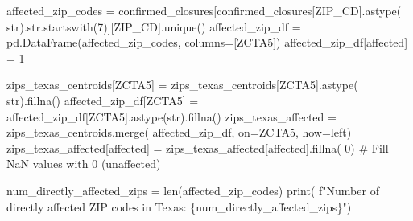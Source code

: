 \documentclass[
  letterpaper,
  DIV=11,
  numbers=noendperiod]{scrartcl}
\newenvironment{Shaded}{\begin{snugshade}}{\end{snugshade}}
\newcommand{\BuiltInTok}[1]{\textcolor[rgb]{0.00,0.23,0.31}{#1}}
\newcommand{\CommentTok}[1]{\textcolor[rgb]{0.37,0.37,0.37}{#1}}
\newcommand{\DecValTok}[1]{\textcolor[rgb]{0.68,0.00,0.00}{#1}}
\newcommand{\NormalTok}[1]{\textcolor[rgb]{0.00,0.23,0.31}{#1}}
\newcommand{\OperatorTok}[1]{\textcolor[rgb]{0.37,0.37,0.37}{#1}}
\newcommand{\SpecialCharTok}[1]{\textcolor[rgb]{0.37,0.37,0.37}{#1}}
\newcommand{\SpecialStringTok}[1]{\textcolor[rgb]{0.13,0.47,0.30}{#1}}
\newcommand{\StringTok}[1]{\textcolor[rgb]{0.13,0.47,0.30}{#1}}
\begin{document}
\begin{Shaded}
\begin{Highlighting}[]
\NormalTok{affected\_zip\_codes }\OperatorTok{=}\NormalTok{ confirmed\_closures[confirmed\_closures[}\StringTok{\textquotesingle{}ZIP\_CD\textquotesingle{}}\NormalTok{].astype(}
    \BuiltInTok{str}\NormalTok{).}\BuiltInTok{str}\NormalTok{.startswith(}\StringTok{\textquotesingle{}7\textquotesingle{}}\NormalTok{)][}\StringTok{\textquotesingle{}ZIP\_CD\textquotesingle{}}\NormalTok{].unique()}
\NormalTok{affected\_zip\_df }\OperatorTok{=}\NormalTok{ pd.DataFrame(affected\_zip\_codes, columns}\OperatorTok{=}\NormalTok{[}\StringTok{\textquotesingle{}ZCTA5\textquotesingle{}}\NormalTok{])}
\NormalTok{affected\_zip\_df[}\StringTok{\textquotesingle{}affected\textquotesingle{}}\NormalTok{] }\OperatorTok{=} \DecValTok{1}

\NormalTok{zips\_texas\_centroids[}\StringTok{\textquotesingle{}ZCTA5\textquotesingle{}}\NormalTok{] }\OperatorTok{=}\NormalTok{ zips\_texas\_centroids[}\StringTok{\textquotesingle{}ZCTA5\textquotesingle{}}\NormalTok{].astype(}
    \BuiltInTok{str}\NormalTok{).fillna(}\StringTok{\textquotesingle{}\textquotesingle{}}\NormalTok{)}
\NormalTok{affected\_zip\_df[}\StringTok{\textquotesingle{}ZCTA5\textquotesingle{}}\NormalTok{] }\OperatorTok{=}\NormalTok{ affected\_zip\_df[}\StringTok{\textquotesingle{}ZCTA5\textquotesingle{}}\NormalTok{].astype(}\BuiltInTok{str}\NormalTok{).fillna(}\StringTok{\textquotesingle{}\textquotesingle{}}\NormalTok{)}
\NormalTok{zips\_texas\_affected }\OperatorTok{=}\NormalTok{ zips\_texas\_centroids.merge(}
\NormalTok{    affected\_zip\_df, on}\OperatorTok{=}\StringTok{\textquotesingle{}ZCTA5\textquotesingle{}}\NormalTok{, how}\OperatorTok{=}\StringTok{\textquotesingle{}left\textquotesingle{}}\NormalTok{)}
\NormalTok{zips\_texas\_affected[}\StringTok{\textquotesingle{}affected\textquotesingle{}}\NormalTok{] }\OperatorTok{=}\NormalTok{ zips\_texas\_affected[}\StringTok{\textquotesingle{}affected\textquotesingle{}}\NormalTok{].fillna(}
    \DecValTok{0}\NormalTok{)  }\CommentTok{\# Fill NaN values with 0 (unaffected)}

\NormalTok{num\_directly\_affected\_zips }\OperatorTok{=} \BuiltInTok{len}\NormalTok{(affected\_zip\_codes)}
\BuiltInTok{print}\NormalTok{(}
    \SpecialStringTok{f"Number of directly affected ZIP codes in Texas: }\SpecialCharTok{\{}\NormalTok{num\_directly\_affected\_zips}\SpecialCharTok{\}}\SpecialStringTok{"}\NormalTok{)}
\end{Highlighting}
\end{Shaded}
\end{document}
